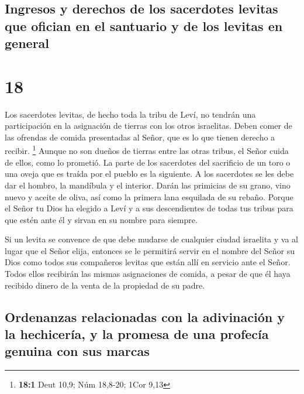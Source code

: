 \hypertarget{ingresos-y-derechos-de-los-sacerdotes-levitas-que-ofician-en-el-santuario-y-de-los-levitas-en-general}{%
\subsection{Ingresos y derechos de los sacerdotes levitas que ofician en
el santuario y de los levitas en
general}\label{ingresos-y-derechos-de-los-sacerdotes-levitas-que-ofician-en-el-santuario-y-de-los-levitas-en-general}}

\hypertarget{section-17}{%
\section{18}\label{section-17}}

 Los sacerdotes levitas, de hecho toda la tribu de Leví,
no tendrán una participación en la asignación de tierras con los otros
israelitas. Deben comer de las ofrendas de comida presentadas al Señor,
que es lo que tienen derecho a recibir. \footnote{\textbf{18:1} Deut
  10,9; Núm 18,8-20; 1Cor 9,13}  Aunque no son dueños de
tierras entre las otras tribus, el Señor cuida de ellos, como lo
prometió.  La parte de los sacerdotes del sacrificio de un
toro o una oveja que es traída por el pueblo es la siguiente. A los
sacerdotes se les debe dar el hombro, la mandíbula y el interior.
 Darán las primicias de su grano, vino nuevo y aceite de
oliva, así como la primera lana esquilada de su rebaño. 
Porque el Señor tu Dios ha elegido a Leví y a sus descendientes de todas
tus tribus para que estén ante él y sirvan en su nombre para siempre.

 Si un levita se convence de que debe mudarse de cualquier
ciudad israelita y va al lugar que el Señor elija, 
entonces se le permitirá servir en el nombre del Señor su Dios como
todos sus compañeros levitas que están allí en servicio ante el Señor.
 Todos ellos recibirán las mismas asignaciones de comida,
a pesar de que él haya recibido dinero de la venta de la propiedad de su
padre.

\hypertarget{ordenanzas-relacionadas-con-la-adivinaciuxf3n-y-la-hechiceruxeda-y-la-promesa-de-una-profecuxeda-genuina-con-sus-marcas}{%
\subsection{Ordenanzas relacionadas con la adivinación y la hechicería,
y la promesa de una profecía genuina con sus
marcas}\label{ordenanzas-relacionadas-con-la-adivinaciuxf3n-y-la-hechiceruxeda-y-la-promesa-de-una-profecuxeda-genuina-con-sus-marcas}}


